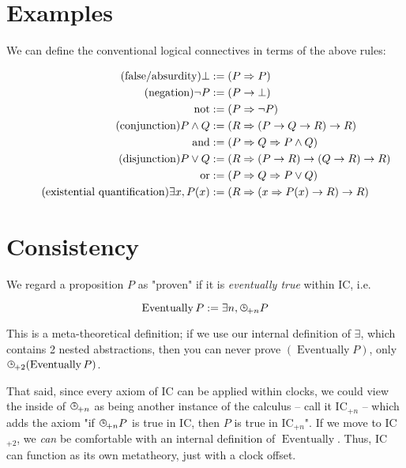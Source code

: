 \documentclass{article}
\begin{document}
  \section{Examples}\label{structure}

  We can define the conventional logical connectives in terms of the above rules:

  \setlength{\jot}{0.4em}
  \begin{align*}
    \tag{false/absurdity}
    \bot &:= (P \Rightarrow{P})\\
    \tag{negation}
    \neg P &:= ({P \rightarrow \bot})\\
    \mathrm{not} &:= (P \Rightarrow \neg P)\\
    \tag{conjunction}
    P \land Q &:= (R \Rightarrow (P \rightarrow Q \rightarrow R) \rightarrow R)\\
    \mathrm{and} &:= (P \Rightarrow Q \Rightarrow P \land Q)\\
    \tag{disjunction}
    P \lor Q &:= (R \Rightarrow (P \rightarrow R) \rightarrow (Q \rightarrow R) \rightarrow R)\\
    \mathrm{or} &:= (P \Rightarrow Q \Rightarrow P \lor Q)\\
    \tag{existential quantification}
    \exists x, P(x) &:= (R \Rightarrow (x \Rightarrow P(x) \rightarrow R) \rightarrow R)\\
  \end{align*}


  \section{Consistency}\label{consistency}
  
  We regard a proposition $P$ as "proven" if it is \emph{eventually true} within IC, i.e.
  
  \newcommand{\eventually}{\operatorname{\mathrm{Eventually}}}
  
  \[ \eventually P := \exists n, \clocksub{+n} P \]
  
  This is a meta-theoretical definition; if we use our internal definition of $\exists$, which contains 2 nested abstractions, then you can never prove $(\eventually P)$, only $\clocksub{+2}(\eventually P)$.
  
  That said, since every axiom of IC can be applied within clocks, we could view the inside of $\clocksub{+n}$ as being another instance of the calculus – call it IC$_{+n}$ – which adds the axiom "if $\clocksub{+n} P$ is true in IC, then $P$ is true in IC$_{+n}$". If we move to IC$_{+2}$, we \emph{can} be comfortable with an internal definition of $\eventually$. Thus, IC can function as its own metatheory, just with a clock offset.
  
\end{document}
